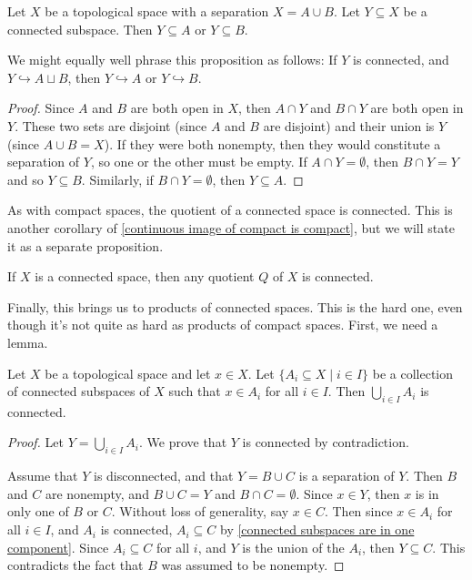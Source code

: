 \documentclass[noname]{notes}
\begin{document}
\begin{proposition}
\label{connected subspaces are in one component}
	Let $X$ be a topological space with a separation $X = A \cup B$. Let $Y \subseteq X$ be a connected subspace. Then $Y \subseteq A$ or $Y \subseteq B$. 
\end{proposition}

We might equally well phrase this proposition as follows: If $Y$ is connected, and $Y \hookrightarrow A \sqcup B$, then $Y \hookrightarrow A$ or $Y \hookrightarrow B$. 

\begin{proof}
	Since $A$ and $B$ are both open in $X$, then $A \cap Y$ and $B \cap Y$ are both open in $Y$. These two sets are disjoint (since $A$ and $B$ are disjoint) and their union is $Y$ (since $A \cup B = X$). If they were both nonempty, then they would constitute a separation of $Y$, so one or the other must be empty. If $A \cap Y = \emptyset$, then $B \cap Y = Y$ and so $Y \subseteq B$. Similarly, if $B \cap Y = \emptyset$, then $Y \subseteq A$. 
\end{proof}

As with compact spaces, the quotient of a connected space is connected. This is another corollary of
\cref{continuous image of compact is compact}, but we will state it as a separate proposition. 

\begin{proposition}
	If $X$ is a connected space, then any quotient $Q$ of $X$ is connected. 
\end{proposition}

Finally, this brings us to products of connected spaces. This is the hard one, even though it's not quite as hard as products of compact spaces. First, we need a lemma. 

\begin{lemma}
\label{wedge of connected is connected}
	Let $X$ be a topological space and let $x \in X$. Let $\{A_i \subseteq X \mid i \in I\}$ be a collection of connected subspaces of $X$ such that $x \in A_i$ for all $i \in I$. Then $\bigcup_{i \in I} A_i$ is connected. 
\end{lemma}

\begin{proof}
	Let $Y = \bigcup_{i \in I} A_i$. We prove that $Y$ is connected by contradiction. 


	Assume that $Y$ is disconnected, and that $Y = B \cup C$ is a separation of $Y$. Then $B$ and $C$ are nonempty, and $B \cup C = Y$ and $B \cap C = \emptyset$. Since $x \in Y$, then $x$ is in only one of $B$ or $C$. Without loss of generality, say $x \in C$. Then since $x\in A_i$ for all $i \in I$, and $A_i$ is connected, $A_i \subseteq C$ by \cref{connected subspaces are in one component}. Since $A_i \subseteq C$ for all $i$, and $Y$ is the union of the $A_i$, then $Y \subseteq C$. This contradicts the fact that $B$ was assumed to be nonempty. 
\end{proof}
\end{document}
